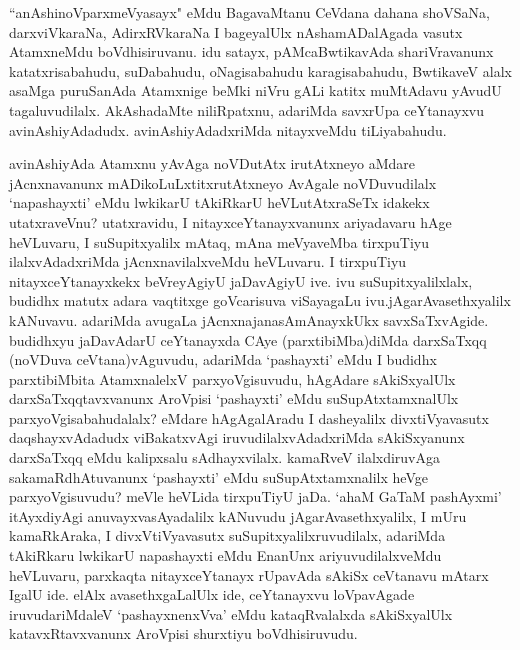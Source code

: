 \begin{artha}
``anAshinoV\s parxmeVyasayx" eMdu BagavaMtanu CeVdana dahana shoVSaNa, darxviVkaraNa, AdirxRVkaraNa I bageyalUlx nAshamADalAgada vasutx AtamxneMdu boVdhisiruvanu. idu satayx, pAMcaBwtikavAda shariVravanunx katatxrisabahudu, suDabahudu, oNagisabahudu karagisabahudu, BwtikaveV alalx asaMga puruSanAda Atamxnige beMki niVru gALi katitx muMtAdavu yAvudU tagaluvudilalx. AkAshadaMte niliRpatxnu, adariMda savxrUpa ceYtanayxvu avinAshiyAdadudx. avinAshiyAdadxriMda nitayxveMdu tiLiyabahudu. 
\end{artha}


\begin{artha}
avinAshiyAda Atamxnu yAvAga noVDutAtx irutAtxneyo aMdare jAcnxnavanunx mADikoLuLxtitxrutAtxneyo AvAgale noVDuvudilalx `napashayxti' eMdu lwkikarU tAkiRkarU heVLutAtxraSeTx idakekx utatxraveVnu? utatxravidu, I nitayxceYtanayxvanunx ariyadavaru hAge heVLuvaru, I suSupitxyalilx mAtaq, mAna meVyaveMba tirxpuTiyu ilalxvAdadxriMda jAcnxnavilalxveMdu heVLuvaru. I tirxpuTiyu nitayxceYtanayxkekx beVreyAgiyU jaDavAgiyU ive. ivu suSupitxyalilxlalx, budidhx matutx adara vaqtitxge goVcarisuva viSayagaLu ivu.\break jAgarAvasethxyalilx kANuvavu. adariMda avugaLa jAcnxna\break janasAmAnayxkUkx savxSaTxvAgide. budidhxyu jaDavAdarU ceYtanayxda CAye (parxtibiMba)diMda darxSaTxqq (noVDuva ceVtana)vAguvudu, adariMda `pashayxti' eMdu I budidhx parxtibiMbita AtamxnalelxV parxyoVgisuvudu, hAgAdare sAkiSxyalUlx darxSaTxqqtavxvanunx AroVpisi `pashayxti' eMdu suSupAtxtamxnalUlx parxyoVgisabahudalalx? eMdare hAgAgalAradu I dasheyalilx divxtiVyavasutx daqshayxvAdadudx viBakatxvAgi iruvudilalxvAdadxriMda sAkiSxyanunx darxSaTxqq eMdu kalipxsalu sAdhayxvilalx. kamaRveV ilalxdiruvAga sakamaRdhAtuvanunx `pashayxti' eMdu suSupAtxtamxnalilx heVge parxyoVgisuvudu? meVle heVLida tirxpuTiyU jaDa. `ahaM GaTaM pashAyxmi' itAyxdiyAgi anuvayxvasAyadalilx kANuvudu jAgarAvasethxyalilx, I mUru kamaRkAraka, I divxVtiVyavasutx suSupitxyalilxruvudilalx, adariMda tAkiRkaru lwkikarU napashayxti eMdu EnanUnx ariyuvudilalxveMdu heVLuvaru, parxkaqta nitayxceYtanayx rUpavAda sAkiSx ceVtanavu mAtarx IgalU ide. elAlx avasethxgaLalUlx ide, ceYtanayxvu loVpavAgade iruvudariMdaleV `pashayxnenxVva' eMdu kataqRvalalxda sAkiSxyalUlx katavxRtavxvanunx AroVpisi shurxtiyu boVdhisiruvudu. 
\end{artha}%


